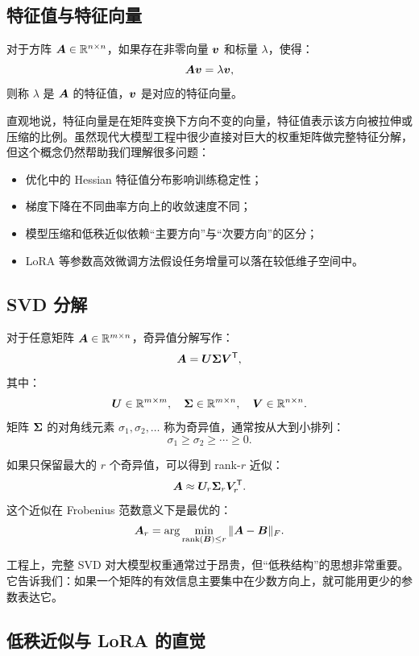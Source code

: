 \subsection{特征值与特征向量}
\label{subsec:eigenvalue-eigenvector}

对于方阵 $\bm{A}\in\mathbb{R}^{n\times n}$，如果存在非零向量 $\bm{v}$ 和标量 $\lambda$，使得：
\[
  \bm{A}\bm{v}=\lambda\bm{v},
\]
则称 $\lambda$ 是 $\bm{A}$ 的特征值，$\bm{v}$ 是对应的特征向量。

直观地说，特征向量是在矩阵变换下方向不变的向量，特征值表示该方向被拉伸或压缩的比例。虽然现代大模型工程中很少直接对巨大的权重矩阵做完整特征分解，但这个概念仍然帮助我们理解很多问题：

\begin{itemize}
  \item 优化中的 Hessian 特征值分布影响训练稳定性；
  \item 梯度下降在不同曲率方向上的收敛速度不同；
  \item 模型压缩和低秩近似依赖“主要方向”与“次要方向”的区分；
  \item LoRA 等参数高效微调方法假设任务增量可以落在较低维子空间中。
\end{itemize}

\subsection{SVD 分解}
\label{subsec:svd}

对于任意矩阵 $\bm{A}\in\mathbb{R}^{m\times n}$，奇异值分解写作：
\[
  \bm{A}=\bm{U}\bm{\Sigma}\bm{V}^{\mathsf{T}},
\]
其中：
\[
  \bm{U}\in\mathbb{R}^{m\times m},\quad
  \bm{\Sigma}\in\mathbb{R}^{m\times n},\quad
  \bm{V}\in\mathbb{R}^{n\times n}.
\]
矩阵 $\bm{\Sigma}$ 的对角线元素 $\sigma_1,\sigma_2,\ldots$ 称为奇异值，通常按从大到小排列：
\[
  \sigma_1\geq\sigma_2\geq\cdots\geq 0.
\]

如果只保留最大的 $r$ 个奇异值，可以得到 rank-$r$ 近似：
\[
  \bm{A}\approx \bm{U}_r\bm{\Sigma}_r\bm{V}_r^{\mathsf{T}}.
\]
这个近似在 Frobenius 范数意义下是最优的：
\[
  \bm{A}_r
  =
  \arg\min_{\operatorname{rank}(\bm{B})\le r}
  \|\bm{A}-\bm{B}\|_F.
\]

工程上，完整 SVD 对大模型权重通常过于昂贵，但“低秩结构”的思想非常重要。它告诉我们：如果一个矩阵的有效信息主要集中在少数方向上，就可能用更少的参数表达它。

\subsection{低秩近似与 LoRA 的直觉}
\label{subsec:low-rank-lora}

